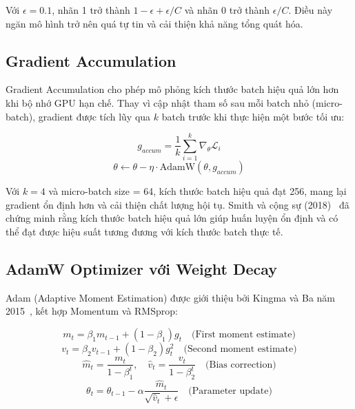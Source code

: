 \documentclass[../BTL.tex]{subfiles}
\begin{document}
Với $\epsilon = 0.1$, nhãn 1 trở thành $1 - \epsilon + \epsilon/C$ và nhãn 0 trở thành $\epsilon/C$. Điều này ngăn mô hình trở nên quá tự tin và cải thiện khả năng tổng quát hóa.

\subsection{Gradient Accumulation}
Gradient Accumulation cho phép mô phỏng kích thước batch hiệu quả lớn hơn khi bộ nhớ GPU hạn chế. Thay vì cập nhật tham số sau mỗi batch nhỏ (micro-batch), gradient được tích lũy qua $k$ batch trước khi thực hiện một bước tối ưu:

\begin{equation}
    g_{accum} = \frac{1}{k} \sum_{i=1}^{k} \nabla_\theta \mathcal{L}_i
\end{equation}
\begin{equation}
    \theta \leftarrow \theta - \eta \cdot \text{AdamW}(\theta, g_{accum})
\end{equation}

Với $k = 4$ và micro-batch size = 64, kích thước batch hiệu quả đạt 256, mang lại gradient ổn định hơn và cải thiện chất lượng hội tụ. Smith và cộng sự (2018)~\cite{smith2018superconvergence} đã chứng minh rằng kích thước batch hiệu quả lớn giúp huấn luyện ổn định và có thể đạt được hiệu suất tương đương với kích thước batch thực tế.

\subsection{AdamW Optimizer với Weight Decay}
Adam (Adaptive Moment Estimation) được giới thiệu bởi Kingma và Ba năm 2015~\cite{kingma2015adam}, kết hợp Momentum và RMSprop:

\begin{equation}
    m_t = \beta_1 m_{t-1} + (1 - \beta_1) g_t \quad \text{(First moment estimate)}
\end{equation}
\begin{equation}
    v_t = \beta_2 v_{t-1} + (1 - \beta_2) g_t^2 \quad \text{(Second moment estimate)}
\end{equation}
\begin{equation}
    \hat{m}_t = \frac{m_t}{1 - \beta_1^t}, \quad \hat{v}_t = \frac{v_t}{1 - \beta_2^t} \quad \text{(Bias correction)}
\end{equation}
\begin{equation}
    \theta_t = \theta_{t-1} - \alpha \frac{\hat{m}_t}{\sqrt{\hat{v}_t} + \epsilon} \quad \text{(Parameter update)}
\end{equation}
\end{document}
